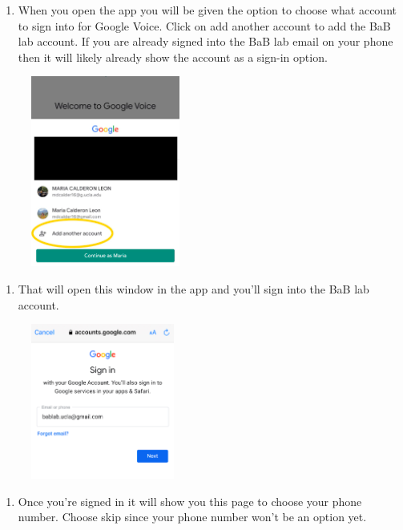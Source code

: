 \documentclass[]{book}
\providecommand{\tightlist}{%
  \setlength{\itemsep}{0pt}\setlength{\parskip}{0pt}}
\begin{document}
\begin{enumerate}
\def\labelenumi{\arabic{enumi})}
\setcounter{enumi}{1}
\tightlist
\item
  When you open the app you will be given the option to choose what account to sign into for Google Voice. Click on add another account to add the BaB lab account. If you are already signed into the BaB lab email on your phone then it will likely already show the account as a sign-in option.
\end{enumerate}

\begin{figure}
\centering
\includegraphics{images/research_protocols/google_voice/pic2.png}
\caption{}
\end{figure}

\begin{enumerate}
\def\labelenumi{\arabic{enumi})}
\setcounter{enumi}{2}
\tightlist
\item
  That will open this window in the app and you'll sign into the BaB lab account.
\end{enumerate}

\begin{figure}
\centering
\includegraphics{images/research_protocols/google_voice/pic3.png}
\caption{}
\end{figure}

\begin{enumerate}
\def\labelenumi{\arabic{enumi})}
\setcounter{enumi}{3}
\tightlist
\item
  Once you're signed in it will show you this page to choose your phone number. Choose skip since your phone number won't be an option yet.
\end{enumerate}
\end{document}

